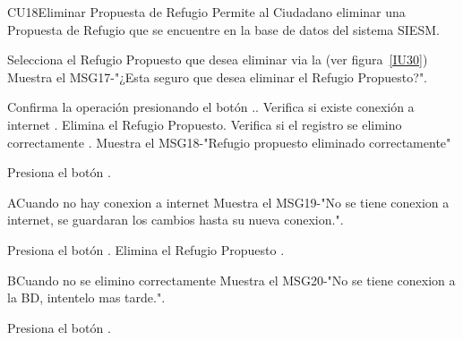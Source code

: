 \begin{UseCase}{CU18}{Eliminar Propuesta de Refugio}{
		Permite al Ciudadano  eliminar una Propuesta de Refugio  que se encuentre en la base de datos del sistema SIESM.\\
}
	
\end{UseCase}


\begin{UCtrayectoria}
	\item\UCactor Selecciona el Refugio Propuesto que desea eliminar via la (ver figura~\ref{IU30})
	\UCpaso Muestra el MSG17-"¿Esta seguro que desea eliminar el Refugio Propuesto?".
	\item\UCactor Confirma la operación presionando el botón ..
	\UCpaso Verifica si existe conexión a internet .
	\UCpaso Elimina el Refugio Propuesto.
	\UCpaso Verifica si el registro se elimino correctamente .
	\UCpaso Muestra el MSG18-"Refugio propuesto eliminado correctamente"
	\item\UCactor Presiona el botón .
\end{UCtrayectoria}


\begin{UCtrayectoriaA}{A}{Cuando no hay conexion a internet}
	\UCpaso Muestra el MSG19-"No se tiene conexion a internet, se guardaran los cambios hasta su nueva conexion.".
	\item\UCactor Presiona el botón .
	\UCpaso Elimina el Refugio Propuesto .	
\end{UCtrayectoriaA}

\begin{UCtrayectoriaA}{B}{Cuando no se elimino correctamente}
	\UCpaso Muestra el MSG20-"No se tiene conexion a la BD, intentelo mas tarde.".
	\item\UCactor Presiona el botón .
\end{UCtrayectoriaA}